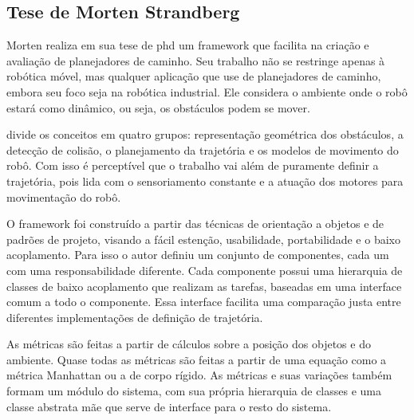 \subsection{Tese de Morten Strandberg}

Morten \cite{Strandberg2004} realiza em sua tese de phd um framework que facilita na criação e avaliação de planejadores de caminho. Seu trabalho não se restringe apenas à robótica móvel, mas qualquer aplicação que use de planejadores de caminho, embora seu foco seja na robótica industrial. Ele considera o ambiente onde o robô estará como dinâmico, ou seja, os obstáculos podem se mover.

\cite{Strandberg2004} divide os conceitos em quatro grupos: representação geométrica dos obstáculos, a detecção de colisão, o planejamento da trajetória e os modelos de movimento do robô. Com isso é perceptível que o trabalho vai além de puramente definir a trajetória, pois lida com o sensoriamento constante e a atuação dos motores para movimentação do robô.

O framework foi construído a partir das técnicas de orientação a objetos e de padrões de projeto, visando a fácil estenção, usabilidade, portabilidade e o baixo acoplamento. Para isso o autor definiu um conjunto de componentes, cada um com uma responsabilidade diferente. Cada componente possui uma hierarquia de classes de baixo acoplamento que realizam as tarefas, baseadas em uma interface comum a todo o componente. Essa interface facilita uma comparação justa entre diferentes implementações de definição de trajetória.

As métricas são feitas a partir de cálculos sobre a posição dos objetos e do ambiente. Quase todas as métricas são feitas a partir de uma equação como a métrica Manhattan ou a de corpo rígido. As métricas e suas variações também formam um módulo do sistema, com sua própria hierarquia de classes e uma classe abstrata mãe que serve de interface para o resto do sistema.